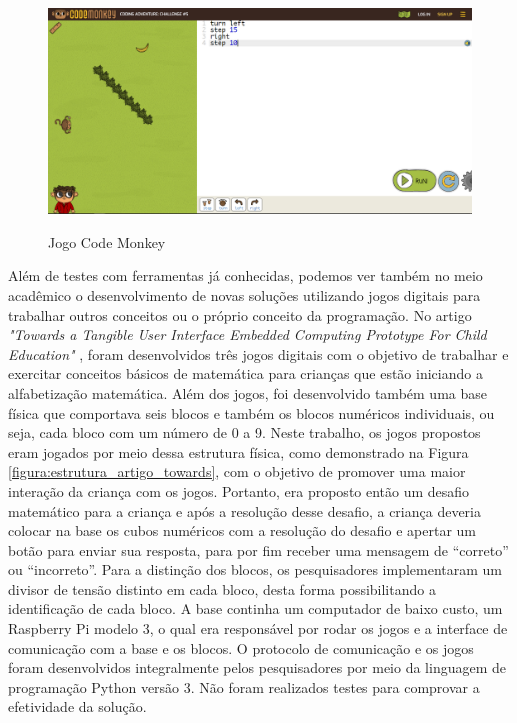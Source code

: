 \begin{figure}[H]
    \caption{Jogo Code Monkey}
    \centering
        \includegraphics[width=\linewidth]{Imagens/cap2/code_monkey.png}
    \label{figura:code_monkey}
\end{figure}

Além de testes com ferramentas já conhecidas, podemos ver também no meio acadêmico o desenvolvimento de novas soluções utilizando jogos digitais para trabalhar outros conceitos ou o próprio conceito da programação. No artigo \textit{"Towards a Tangible User Interface Embedded Computing Prototype For Child Education"} \cite{carneiro_2018}, foram desenvolvidos três jogos digitais com o objetivo de trabalhar e exercitar conceitos básicos de matemática para crianças que estão iniciando a alfabetização matemática. Além dos jogos, foi desenvolvido também uma base física que comportava seis blocos e também os blocos numéricos individuais, ou seja, cada bloco com um número de 0 a 9. Neste trabalho, os jogos propostos eram jogados por meio dessa estrutura física, como demonstrado na Figura \ref{figura:estrutura_artigo_towards}, com o objetivo de promover uma maior interação da criança com os jogos. Portanto, era proposto então um desafio matemático para a criança e após a resolução desse desafio, a criança deveria colocar na base os cubos numéricos com a resolução do desafio e apertar um botão para enviar sua resposta, para por fim receber uma mensagem de “correto” ou “incorreto”. Para a distinção dos blocos, os pesquisadores implementaram um divisor de tensão distinto em cada bloco, desta forma possibilitando a identificação de cada bloco. A base continha um computador de baixo custo, um Raspberry Pi modelo 3, o qual era responsável por rodar os jogos e a interface de comunicação com a base e os blocos. O protocolo de comunicação e os jogos foram desenvolvidos integralmente pelos pesquisadores por meio da linguagem de programação Python versão 3. Não foram realizados testes para comprovar a efetividade da solução. 

